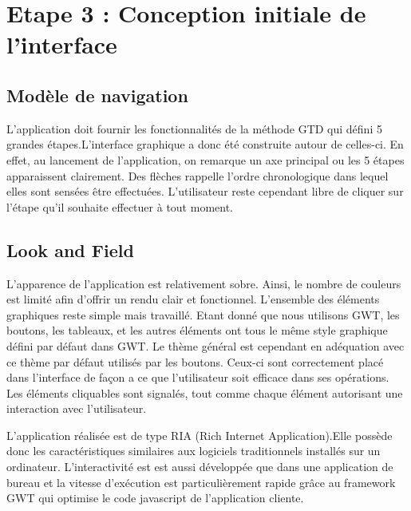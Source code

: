\chapter{Etape 3 : Conception initiale de l’interface}



\section{Modèle de navigation}
L'application doit fournir les fonctionnalités de la méthode GTD qui défini 5 grandes étapes.L'interface graphique a donc été construite autour de celles-ci. En effet, au lancement de l'application, on remarque un axe principal ou les 5 étapes apparaissent clairement. Des flèches rappelle l'ordre chronologique dans lequel elles sont sensées être effectuées. L'utilisateur reste cependant libre de cliquer sur l'étape qu'il souhaite effectuer à tout moment.



\section{Look and Field}
L'apparence de l'application est relativement sobre. Ainsi, le nombre de couleurs est limité afin d'offrir un rendu clair et fonctionnel. L'ensemble des éléments graphiques reste simple mais travaillé. Etant donné que nous utilisons GWT, les boutons, les tableaux, et les autres éléments ont tous le même style graphique défini par défaut dans GWT. Le thème général est cependant en adéquation avec ce thème par défaut utilisés par les boutons. Ceux-ci sont correctement placé dans l'interface de façon a ce que l'utilisateur soit efficace dans ses opérations. Les éléments cliquables sont signalés, tout comme chaque élément autorisant une interaction avec l'utilisateur.

L'application réalisée est de type RIA (Rich Internet Application).Elle possède donc les caractéristiques similaires aux logiciels traditionnels installés sur un ordinateur. L'interactivité est est aussi développée que dans une application de bureau et la vitesse d'exécution est particulièrement rapide grâce au framework GWT qui optimise le code javascript de l'application cliente.


